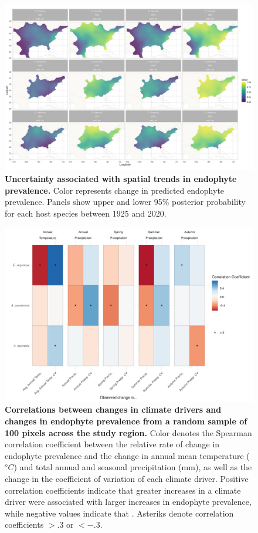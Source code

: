 \documentclass[11pt]{article}
\begin{document}
\begin{figure}[H]
	\centering
	\includegraphics[width = \linewidth]{prevalence_map_CI.png}
	\caption{\textbf{Uncertainty associated with spatial trends in endophyte prevalence.} Color represents change in predicted endophyte prevalence. Panels show upper and lower 95\% posterior probability for each host species between 1925 and 2020.}
\end{figure}


\begin{figure}[H]
	\centering
	\includegraphics[width = \linewidth]{climate_corr_heatmap_subsample.png}
	\caption{\textbf{Correlations between changes in climate drivers and changes in endophyte prevalence from a random sample of 100 pixels across the study region.} Color denotes the Spearman correlation coefficient between the relative rate of change in endophyte prevalence and the change in annual mean temperature ($^oC$) and total annual and seasonal precipitation (mm), as well as the change in the coefficient of variation of each climate driver. Positive correlation coefficients indicate that greater increases in a climate driver were associated with larger increases in endophyte prevalence, while negative values indicate that . Asteriks denote correlation coefficients $> .3$ or $< -.3$.}
	\label{fig:FigA5}
\end{figure}
\end{document}
